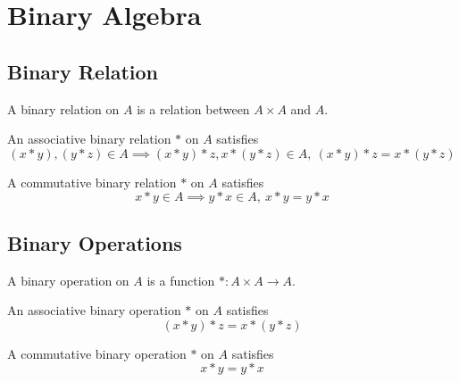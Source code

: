 \section{Binary Algebra}
\subsection{Binary Relation}
\begin{definition}
	A binary relation on $A$ is a relation between $A \times A$ and $A$.
\end{definition}

\begin{definition}[associative]
	An associative binary relation $\ast$ on $A$ satisfies
	\begin{equation}
		(x \ast y),(y \ast z) \in A \implies (x \ast y) \ast z, x \ast (y \ast z) \in A,\ (x \ast y) \ast z = x \ast (y \ast z)
	\end{equation}
\end{definition}

\begin{definition}[commutative]
	A commutative binary relation $\ast$ on $A$ satisfies
	\begin{equation}
		x \ast y \in A \implies y \ast x \in A,\ x \ast y = y \ast x
	\end{equation}
\end{definition}

\subsection{Binary Operations}
\begin{definition}
	A binary operation on $A$ is a function $\ast : A \times A \to A$.
\end{definition}

\begin{definition}[associative]
	An associative binary operation $\ast$ on $A$ satisfies
	\begin{equation}
		(x \ast y) \ast z = x \ast (y \ast z)
	\end{equation}
\end{definition}

\begin{definition}[commutative]
	A commutative binary operation $\ast$ on $A$ satisfies
	\begin{equation}
		x \ast y = y \ast x
	\end{equation}
\end{definition}


